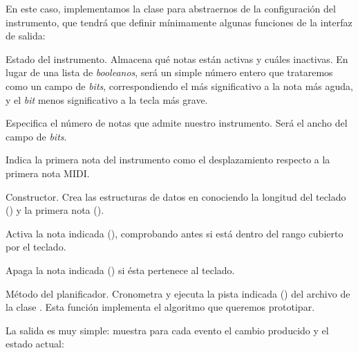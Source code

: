 \smallskip

En este caso, implementamos la clase  para abstraernos de la configuración del instrumento, que tendrá que definir mínimamente algunas funciones de la interfaz de salida:

\begin{description}[style=nextline]
	\item[\code{state}]
	Estado del instrumento. Almacena qué notas están activas y cuáles inactivas. En lugar de una lista de \textit{booleanos}, será un simple número entero que trataremos como un campo de \textit{bits}, correspondiendo el más significativo a la nota más aguda, y el \textit{bit} menos significativo a la tecla más grave.
	
	\item[\code{length}]
	Especifica el número de notas que admite nuestro instrumento. Será el ancho del campo de \textit{bits}.
	
	\item[\code{offset}]
	Indica la primera nota del instrumento como el desplazamiento respecto a la primera nota \acrshort{MIDI}.
	
	\item[\code{\_\_init\_\_(self, length, offset}]
	Constructor. Crea las estructuras de datos en  conociendo la longitud del teclado () y la primera nota ().
	
	\item[\code{note\_on(self, note)}]
	Activa la nota indicada (), comprobando antes si está dentro del rango cubierto por el teclado.
	
	\item[\code{note\_off(self, note)}]
	Apaga la nota indicada () si ésta pertenece al teclado.
	
	\item[\code{play(self, midi, track)}]
	Método del planificador. Cronometra y ejecuta la pista indicada () del archivo de la clase . Esta función implementa el algoritmo que queremos prototipar.
	
\end{description}

La salida es muy simple: muestra para cada evento el cambio producido y el estado actual:

\smallskip

